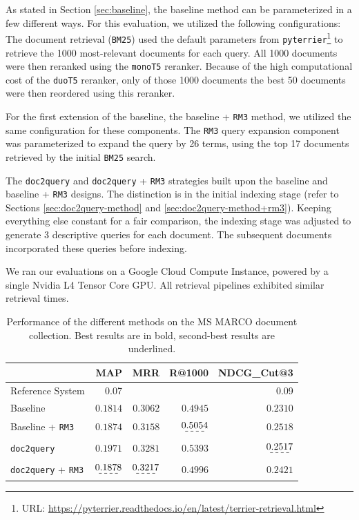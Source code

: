 \documentclass[sigconf]{acmart}
\begin{document}
As stated in Section \ref{sec:baseline}, the baseline method can be parameterized in a few different ways. For this evaluation, we utilized the following configurations: The document retrieval (\texttt{BM25}) used the default parameters from \texttt{pyterrier}\footnote{URL: \url{https://pyterrier.readthedocs.io/en/latest/terrier-retrieval.html}} to retrieve the 1000 most-relevant documents for each query. All 1000 documents were then reranked using the \texttt{monoT5} reranker. Because of the high computational cost of the \texttt{duoT5} reranker, only of those 1000 documents the best 50 documents were then reordered using this reranker.

For the first extension of the baseline, the baseline + \texttt{RM3} method, we utilized the same configuration for these components. The \texttt{RM3} query expansion component was parameterized to expand the query by 26 terms, using the top 17 documents retrieved by the initial \texttt{BM25} search.

The \texttt{doc2query} and \texttt{doc2query} + \texttt{RM3} strategies built upon the baseline and baseline + \texttt{RM3} designs. The distinction is in the initial indexing stage (refer to Sections \ref{sec:doc2query-method} and \ref{sec:doc2query-method+rm3}). Keeping everything else constant for a fair comparison, the indexing stage was adjusted to generate 3 descriptive queries for each document. The subsequent documents incorporated these queries before indexing.

We ran our evaluations on a Google Cloud Compute Instance, powered by a single Nvidia L4 Tensor Core GPU. All retrieval pipelines exhibited similar retrieval times.

\begin{table}[h]
\begin{center}
	\caption{Performance of the different methods on the MS MARCO document collection. Best results are in bold, second-best results are underlined.}
	\begin{tabular}{l|rrrr}
			& MAP & MRR & R@1000 & NDCG\_Cut@3 \\
		\hline
		Reference System & 0.07 &  &  & 0.09 \\
		Baseline & $0.1814$ & $0.3062$ & $0.4945$ & $0.2310$ \\
		Baseline + \texttt{RM3} & $0.1874$ & $0.3158$ & $\dashuline{0.5054}$ & $\mathbf{0.2518}$ \\
		\texttt{doc2query} & $\mathbf{0.1971}$ & $\mathbf{0.3281}$ & $\mathbf{0.5393}$ & $\dashuline{0.2517}$ \\
		\texttt{doc2query} + \texttt{RM3} & $\dashuline{0.1878}$ & $\dashuline{0.3217}$ & $0.4996$ & $0.2421$
	\end{tabular}
	\label{table:1}
\end{center}
\end{table}
\end{document}
